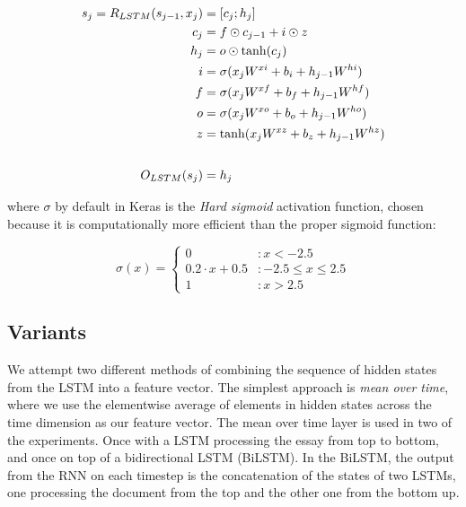 \begin{equation}
  \begin{aligned}
  s_j = R_{LSTM}(s_{j-1}, x_j) &= [c_j;h_j] \\
                           c_j &= f \odot c_{j-1} + i \odot z \\
                           h_j &= o \odot \tanh(c_j) \\
                             i &= \sigma(x_j W^{xi} + b_i + h_{j-1} W^{hi}) \\
                             f &= \sigma(x_j W^{xf} + b_f + h_{j-1} W^{hf}) \\
                             o &= \sigma(x_j W^{xo} + b_o + h_{j-1} W^{ho}) \\
                             z &= \tanh(x_j W^{xz} + b_z + h_{j-1} W^{hz}) \\
                             \\[1\jot]
                 O_{LSTM}(s_j) &= h_j
  \end{aligned}
\end{equation}

where $\sigma$ by default in Keras is the \emph{Hard sigmoid} activation
function, chosen because it is computationally more efficient than the proper
sigmoid function:

\begin{equation}
  \sigma(x) = \begin{cases}
    0                 & : x < -2.5 \\
    0.2 \cdot x + 0.5 & : -2.5 \leq x \leq 2.5 \\
    1                 & : x > 2.5
  \end{cases}
\end{equation}


\subsection{Variants}

We attempt two different methods of combining the sequence of hidden states
from the \ac{LSTM} into a feature vector. The simplest approach is \emph{mean
over time}, where we use the elementwise average of elements in hidden states
across the time dimension as our feature vector. The mean over time layer is
used in two of the experiments. Once with a \ac{LSTM} processing the essay
from top to bottom, and once on top of a bidirectional LSTM (BiLSTM). In the
BiLSTM, the output from the \ac{RNN} on each timestep is the concatenation of
the states of two \acp{LSTM}, one processing the document from the top and
the other one from the bottom up.

